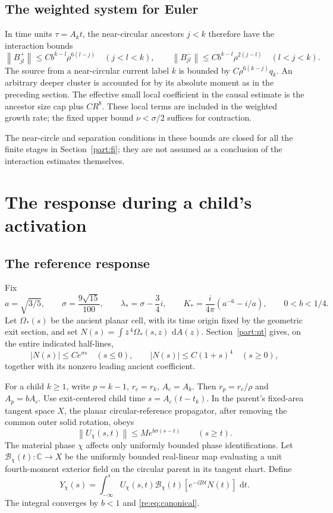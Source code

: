 \documentclass[11pt]{amsart}
\theoremstyle{remark}
\numberwithin{equation}{section}
\newcommand{\norm}[1]{\left\lVert#1\right\rVert}
\newcommand{\C}{\mathbb C}
\newcommand{\dd}{\,\mathrm d}
\begin{document}
\subsection{The weighted system for Euler}
In time units $\tau=A_k t$, the near-circular ancestors $j<k$ therefore have the interaction bounds
\[
 \norm{B^+_{jl}}\le C b^{k-l}\rho^{6(l-j)}\quad(j<l<k),
 \qquad
 \norm{B^-_{jl}}\le C b^{k-l}\rho^{2(j-l)}\quad(l<j<k).
\]
The source from a near-circular current label $k$ is bounded by $C\rho^{6(k-j)}q_k$. An arbitrary deeper cluster is accounted for by its absolute moment as in the preceding section. The effective small local coefficient in the causal estimate is the ancestor size cap plus $CR^8$. These local terms are included in the weighted growth rate; the fixed upper bound $\nu<\sigma/2$ suffices for contraction.


The near-circle and separation conditions in these bounds are closed
for all the finite stages in Section~\ref{part:fi}; they are not assumed
as a conclusion of the interaction estimates themselves.



\section{The response during a child's activation}\label{part:re}
\subsection{The reference response}
Fix
\[
 a=\sqrt{3/5},\qquad \sigma=\frac{9\sqrt{15}}{100},\qquad
 \lambda_*=\sigma-\frac34i,\qquad
 K_*=\frac{i}{4\pi}(a^{-6}-i/a),\qquad 0<b<1/4.
\]
Let $\Omega_*(s)$ be the ancient planar cell, with its time origin fixed
by the geometric exit section, and set
$N(s)=\int\overline z^{\,4}\Omega_*(s,z)\,\dd A(z)$.
Section~\ref{part:nt} gives, on the entire indicated half-lines,
\begin{equation}\label{re:eq:canonical}
 |N(s)|\leq C e^{\sigma s}\quad(s\leq0),\qquad
 |N(s)|\leq C(1+s)^4\quad(s\geq0),
\end{equation}
together with its nonzero leading ancient coefficient.

For a child $k\geq1$, write $p=k-1$, $r_c=r_k$, $A_c=A_k$.
Then $r_p=r_c/\rho$ and $A_p=bA_c$. Use exit-centered child time
$s=A_c(t-t_k)$. In the parent's fixed-area tangent space $X$, the
planar circular-reference propagator, after removing the common outer
solid rotation, obeys
\begin{equation}\label{re:eq:propagator}
 \norm{U_\chi(s,t)}\leq M e^{b\sigma(s-t)}\qquad(s\geq t).
\end{equation}
The material phase $\chi$ affects only uniformly bounded phase
identifications. Let $\mathcal B_\chi(t):\C\to X$ be the uniformly
bounded real-linear map evaluating a unit fourth-moment exterior field
on the circular parent in its tangent chart. Define
\begin{equation}\label{re:eq:Yfull}
 Y_\chi(s)=\int_{-\infty}^s U_\chi(s,t)
                 \mathcal B_\chi(t)[e^{-i2bt}N(t)]\,\dd t.
\end{equation}
The integral converges by $b<1$ and \eqref{re:eq:canonical}.
\end{document}
